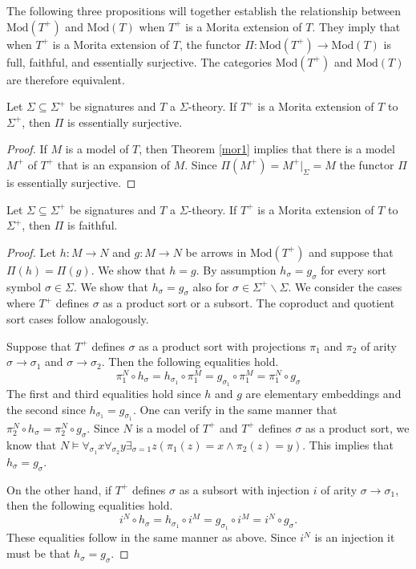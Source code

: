 The following three propositions will together establish the
relationship between $\text{Mod}(T^+)$ and $\text{Mod}(T)$ when $T^+$
is a Morita extension of $T$. They imply that when $T^+$ is a Morita
extension of $T$, the functor
$\Pi:\text{Mod}(T^+)\rightarrow\text{Mod}(T)$ is full, faithful, and
essentially surjective. The categories $\mathrm{Mod}(T^+)$ and
$\mathrm{Mod}(T)$ are therefore equivalent.

\begin{prop} Let $\Sigma\subseteq\Sigma^+$ be signatures and $T$ a
  $\Sigma$-theory. If $T^+$ is a Morita extension of $T$ to
  $\Sigma^+$, then $\Pi$ is essentially
  surjective. \label{more1} \end{prop}

\begin{proof} If $M$ is a model of $T$, then Theorem \ref{mor1}
  implies that there is a model $M^+$ of $T^+$ that is an expansion of
  $M$. Since $\Pi(M^+)=M^+|_\Sigma=M$ the functor $\Pi$ is essentially
  surjective.
\end{proof}


\begin{prop} Let $\Sigma\subseteq\Sigma^+$ be signatures and $T$ a
  $\Sigma$-theory. If $T^+$ is a Morita extension of $T$ to
  $\Sigma^+$, then $\Pi$ is faithful. \label{more2} \end{prop}

\begin{proof}
  Let $h:M\rightarrow N$ and $g:M\rightarrow N$ be arrows in
  $\text{Mod}(T^+)$ and suppose that $\Pi(h)=\Pi(g)$. We show that
  $h=g$. By assumption $h_\sigma=g_\sigma$ for every sort symbol
  $\sigma\in\Sigma$. We show that $h_\sigma=g_\sigma$ also for
  $\sigma\in\Sigma^+\backslash\Sigma$. We consider the cases where
  $T^+$ defines $\sigma$ as a product sort or a subsort. The coproduct
  and quotient sort cases follow analogously.

  Suppose that $T^+$ defines $\sigma$ as a product sort with
  projections $\pi_1$ and $\pi_2$ of arity $\sigma\rightarrow\sigma_1$
  and $\sigma\rightarrow\sigma_2$. Then the following equalities hold.
\[ 
\pi_1^N\circ
h_\sigma=h_{\sigma_1}\circ\pi_1^M=g_{\sigma_1}\circ\pi_1^M=\pi_1^N\circ
g_\sigma
\]
The first and third equalities hold since $h$ and $g$ are elementary
embeddings and the second since $h_{\sigma_1}=g_{\sigma_1}$. One can
verify in the same manner that
$\pi_2^N\circ h_\sigma=\pi_2^N\circ g_\sigma$. Since $N$ is a model of
$T^+$ and $T^+$ defines $\sigma$ as a product sort, we know that
$N\vDash\forall_{\sigma_1}x\forall_{\sigma_2}y\exists_{\sigma=1}
z(\pi_1(z)=x\land\pi_2(z)=y)$. This implies that $h_\sigma=g_\sigma$.

On the other hand, if $T^+$ defines $\sigma$ as a subsort with
injection $i$ of arity $\sigma\rightarrow\sigma_1$, then the following
equalities hold.
\[ i^N\circ h_\sigma=h_{\sigma_1}\circ i^M=g_{\sigma_1}\circ
  i^M=i^N\circ g_\sigma .\] These equalities follow in the same manner
as above. Since $i^N$ is an injection it must be that
$h_\sigma=g_\sigma$. \end{proof}

